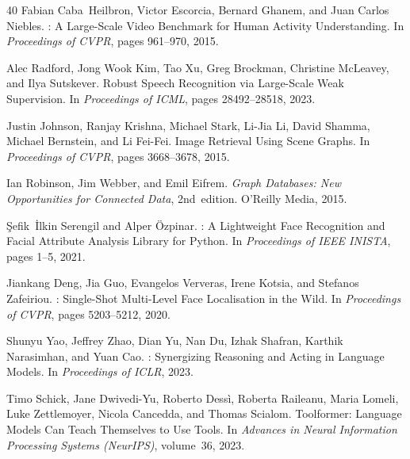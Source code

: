 \documentclass[11pt]{article}
\begin{document}
\begin{thebibliography}{40}
Fabian Caba~Heilbron, Victor Escorcia, Bernard Ghanem, and Juan Carlos
Niebles.
: A Large-Scale Video Benchmark for Human Activity
Understanding.
\newblock In \emph{Proceedings of CVPR}, pages 961--970, 2015.


Alec Radford, Jong Wook Kim, Tao Xu, Greg Brockman, Christine McLeavey,
and Ilya Sutskever.
\newblock Robust Speech Recognition via Large-Scale Weak Supervision.
\newblock In \emph{Proceedings of ICML}, pages 28492--28518, 2023.


Justin Johnson, Ranjay Krishna, Michael Stark, Li-Jia Li, David Shamma,
Michael Bernstein, and Li Fei-Fei.
\newblock Image Retrieval Using Scene Graphs.
\newblock In \emph{Proceedings of CVPR}, pages 3668--3678, 2015.

Ian Robinson, Jim Webber, and Emil Eifrem.
\newblock \emph{Graph Databases: New Opportunities for Connected Data},
2nd~edition.
\newblock O'Reilly Media, 2015.


\c{S}efik~\.{I}lkin Serengil and Alper \"{O}zpinar.
: A Lightweight Face Recognition and Facial Attribute
Analysis Library for Python.
\newblock In \emph{Proceedings of IEEE INISTA}, pages 1--5, 2021.

Jiankang Deng, Jia Guo, Evangelos Ververas, Irene Kotsia, and Stefanos
Zafeiriou.
: Single-Shot Multi-Level Face Localisation in the Wild.
\newblock In \emph{Proceedings of CVPR}, pages 5203--5212, 2020.


Shunyu Yao, Jeffrey Zhao, Dian Yu, Nan Du, Izhak Shafran, Karthik
Narasimhan, and Yuan Cao.
: Synergizing Reasoning and Acting in Language Models.
\newblock In \emph{Proceedings of ICLR}, 2023.

Timo Schick, Jane Dwivedi-Yu, Roberto Dess\`{i}, Roberta Raileanu, Maria
Lomeli, Luke Zettlemoyer, Nicola Cancedda, and Thomas Scialom.
\newblock Toolformer: Language Models Can Teach Themselves to Use Tools.
\newblock In \emph{Advances in Neural Information Processing Systems
(NeurIPS)}, volume~36, 2023.

\end{thebibliography}
\end{document}
